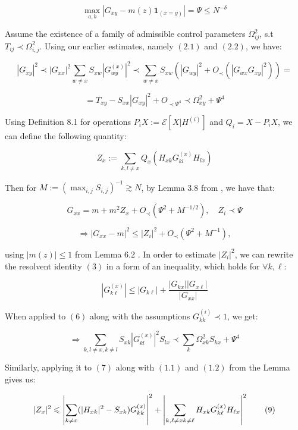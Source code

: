 \documentclass[11pt]{article}
\newcommand{\E}{\mathcal{E}}
\begin{document}
 $$\max_{a, b}|G_{xy}-m(z)\mathbf{1}_{(x=y)}| = \Psi \leq N^{-\delta}$$

Assume the existence of a family of admissible control parameters $\Omega_{ij}^2$, s.t $T_{ij}\prec \Omega_{i, j}^2$. Using our earlier estimates, namely $(2.1)$ and $(2.2)$,  we have: 

$$|G_{xy}|^2\prec |G_{xx}|^2\sum_{w\neq x}S_{xw}|G^{(x)}_{wy}|^2\prec\sum_{w\neq x} S_{xw}\left(|G_{wy}|^2+O_{\prec}(|G_{wx}G_{xy}|^2)\right)=$$

\begin{equation*}= T_{xy}-S_{xx}|G_{xy}|^2+O_{\prec \Psi^4}\prec \Omega_{xy}^2+\Psi^4\tag{6}\end{equation*}

  

\noindent Using Definition 8.1 \cite{dynamic} for operations $P_iX:= \E[X|H^{(i)}]$ and $Q_i = X-P_iX$, we can define the following quantity:

  

\begin{equation*}Z_x:=\sum_{k, l\neq x}Q_{x}\left(H_{xk}G_{kl}^{(x)}H_{lx}\right)\tag{7}\end{equation*}

  

\noindent Then for $M :=\left(\max_{i, j}S_{i,j}\right)^{-1}\gtrsim N$, by Lemma 3.8 from \cite{21}, we have that:

$$G_{xx} = m+m^2 Z_x + O_{\prec}\left(\Psi^2+M^{-1/2}\right), \quad Z_i\prec \Psi$$

$$\Rightarrow |G_{xx}-m|^2\leqslant|Z_i|^2+O_{\prec}(\Psi^2+M^{-1}),$$

using $|m(z)|\leqslant 1$ from Lemma 6.2 \cite{dynamic}. In order to estimate $|Z_i|^2$, we can rewrite the resolvent identity $(3)$ in a form of an inequality, which holds for $\forall k, \ell$:

$$|G_{k\ell}^{(x)}|\leq |G_{k\ell}|+\frac{|G_{kx}||G_{x\ell}|}{|G_{xx}|}$$

When applied to $(6)$ along with the assumptions $G_{kk}^{(i)}\prec 1$, we get: 

\begin{equation*}\Rightarrow \sum_{k, l\neq x, k\neq l}S_{xk}|G_{kl}^{(x)}|^2S_{lx}\prec \sum_{k}\Omega_{xk}^2S_{kx}+\Psi^4\tag{8}\end{equation*}

\noindent Similarly, applying it to $(7)$ along with $(1.1)$ and $(1.2)$ from the Lemma gives us: 

\begin{equation*}|Z_x|^2\leqslant \left\vert\sum_{k\neq x}(|H_{xk}|^2-S_{xk})G_{kk}^{(x)}\right\vert^2+\left\vert\sum_{k, \ell\neq x\\ k\neq \ell}H_{xk}G_{k\ell}^{(x)}H_{\ell x}\right\vert^2 \tag{9}\end{equation*}
\end{document}
